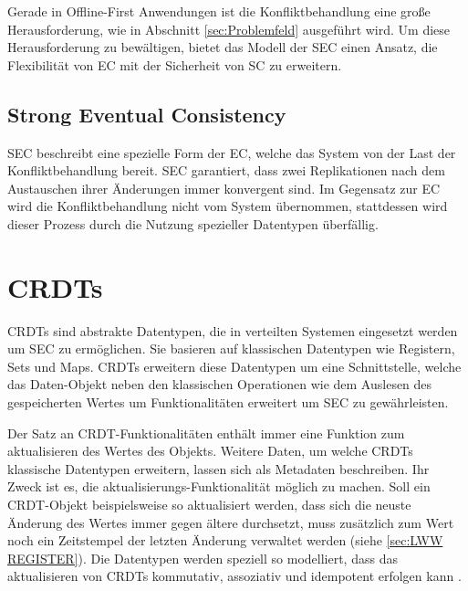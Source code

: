 \documentclass[a4paper, 12pt]{scrreprt}
\begin{document}
Gerade in Offline-First Anwendungen ist die Konfliktbehandlung eine große Herausforderung, wie in Abschnitt \ref{sec:Problemfeld} ausgeführt wird. Um diese Herausforderung zu bewältigen, bietet das Modell der \acf{SEC} einen Ansatz, die Flexibilität von \ac{EC} mit der Sicherheit von \ac{SC} zu erweitern. 




\subsection{Strong Eventual Consistency}


\ac{SEC} beschreibt eine spezielle Form der \acf{EC}, welche das System von der Last der Konfliktbehandlung bereit. \ac{SEC} garantiert, dass zwei Replikationen nach dem Austauschen ihrer Änderungen immer konvergent sind. Im Gegensatz zur \ac{EC} wird die Konfliktbehandlung nicht vom System übernommen, stattdessen wird dieser Prozess durch die Nutzung spezieller Datentypen überfällig.


\section{CRDTs}

CRDTs sind abstrakte Datentypen, die in verteilten Systemen eingesetzt werden um \ac{SEC} zu ermöglichen. Sie basieren auf klassischen Datentypen wie Registern, Sets und Maps. CRDTs erweitern diese Datentypen um eine Schnittstelle, welche das Daten-Objekt neben den klassischen Operationen wie dem Auslesen des gespeicherten Wertes um Funktionalitäten erweitert um \ac{SEC} zu gewährleisten.\autocite[S.1 ]{ArticleCRDTOverview}

Der Satz an CRDT-Funktionalitäten enthält immer eine Funktion zum aktualisieren des Wertes des Objekts. Weitere Daten, um welche CRDTs klassische Datentypen erweitern, lassen sich als Metadaten beschreiben. Ihr Zweck ist es, die aktualisierungs-Funktionalität möglich zu machen. Soll ein CRDT-Objekt beispielsweise so aktualisiert werden, dass sich die neuste Änderung des Wertes immer gegen ältere durchsetzt, muss zusätzlich zum Wert noch ein Zeitstempel der letzten Änderung verwaltet werden (siehe \ref{sec:LWW REGISTER}).
Die Datentypen werden speziell so modelliert, dass das aktualisieren von CRDTs kommutativ, assoziativ und idempotent erfolgen kann \autocite{InproceedingsCrdtsInProduction}.
\end{document}
